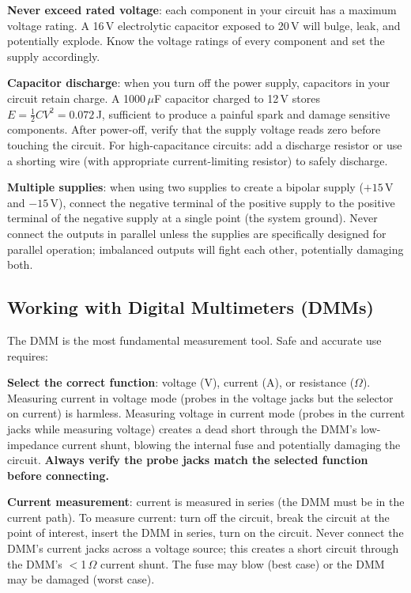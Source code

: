 \documentclass[11pt,letterpaper,twoside,openany]{book}
\begin{document}
\textbf{Never exceed rated voltage}: each component in your circuit has a maximum voltage rating. A 16\,V electrolytic capacitor exposed to 20\,V will bulge, leak, and potentially explode. Know the voltage ratings of every component and set the supply accordingly.

\textbf{Capacitor discharge}: when you turn off the power supply, capacitors in your circuit retain charge. A 1000\,$\mu$F capacitor charged to 12\,V stores $E = \frac{1}{2}CV^2 = 0.072$\,J, sufficient to produce a painful spark and damage sensitive components. After power-off, verify that the supply voltage reads zero before touching the circuit. For high-capacitance circuits: add a discharge resistor or use a shorting wire (with appropriate current-limiting resistor) to safely discharge.

\textbf{Multiple supplies}: when using two supplies to create a bipolar supply ($+15$\,V and $-15$\,V), connect the negative terminal of the positive supply to the positive terminal of the negative supply at a single point (the system ground). Never connect the outputs in parallel unless the supplies are specifically designed for parallel operation; imbalanced outputs will fight each other, potentially damaging both.

\subsection*{Working with Digital Multimeters (DMMs)}
The DMM is the most fundamental measurement tool. Safe and accurate use requires:

\textbf{Select the correct function}: voltage (V), current (A), or resistance ($\Omega$). Measuring current in voltage mode (probes in the voltage jacks but the selector on current) is harmless. Measuring voltage in current mode (probes in the current jacks while measuring voltage) creates a dead short through the DMM's low-impedance current shunt, blowing the internal fuse and potentially damaging the circuit. \textbf{Always verify the probe jacks match the selected function before connecting.}

\textbf{Current measurement}: current is measured in series (the DMM must be in the current path). To measure current: turn off the circuit, break the circuit at the point of interest, insert the DMM in series, turn on the circuit. Never connect the DMM's current jacks across a voltage source; this creates a short circuit through the DMM's $<$1\,$\Omega$ current shunt. The fuse may blow (best case) or the DMM may be damaged (worst case).
\end{document}
